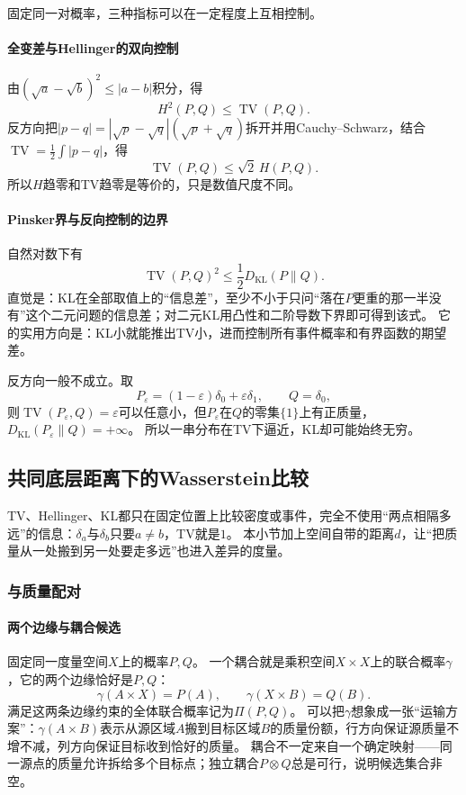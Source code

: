 固定同一对概率，三种指标可以在一定程度上互相控制。

\paragraph{全变差与Hellinger的双向控制}

由$(\sqrt a-\sqrt b)^2\leq|a-b|$积分，得
\[
 H^2(P,Q)\leq\operatorname{TV}(P,Q).
\]
反方向把$|p-q|=|\sqrt p-\sqrt q|(\sqrt p+\sqrt q)$拆开并用Cauchy–Schwarz，结合$\operatorname{TV}=\frac12\int|p-q|$，得
\[
 \operatorname{TV}(P,Q)\leq\sqrt2\,H(P,Q).
\]
所以$H$趋零和TV趋零是等价的，只是数值尺度不同。

\paragraph{Pinsker界与反向控制的边界}

自然对数下有
\[
 \operatorname{TV}(P,Q)^2\leq\frac12D_{\mathrm{KL}}(P\|Q).
\]
直觉是：KL在全部取值上的“信息差”，至少不小于只问“落在$P$更重的那一半没有”这个二元问题的信息差；对二元KL用凸性和二阶导数下界即可得到该式。
它的实用方向是：KL小就能推出TV小，进而控制所有事件概率和有界函数的期望差。

反方向一般不成立。取
\[
 P_\varepsilon=(1-\varepsilon)\delta_0+\varepsilon\delta_1,\qquad Q=\delta_0,
\]
则$\operatorname{TV}(P_\varepsilon,Q)=\varepsilon$可以任意小，但$P_\varepsilon$在$Q$的零集$\{1\}$上有正质量，$D_{\mathrm{KL}}(P_\varepsilon\|Q)=+\infty$。
所以一串分布在TV下逼近，KL却可能始终无穷。

\subsection{共同底层距离下的Wasserstein比较}

TV、Hellinger、KL都只在固定位置上比较密度或事件，完全不使用“两点相隔多远”的信息：$\delta_a$与$\delta_b$只要$a\neq b$，TV就是$1$。
本小节加上空间自带的距离$d$，让“把质量从一处搬到另一处要走多远”也进入差异的度量。

\subsubsection{与质量配对}

\paragraph{两个边缘与耦合候选}

固定同一度量空间$X$上的概率$P,Q$。
一个耦合就是乘积空间$X\times X$上的联合概率$\gamma$，它的两个边缘恰好是$P,Q$：
\[
 \gamma(A\times X)=P(A),\qquad
 \gamma(X\times B)=Q(B).
\]
满足这两条边缘约束的全体联合概率记为$\Pi(P,Q)$。
可以把$\gamma$想象成一张“运输方案”：$\gamma(A\times B)$表示从源区域$A$搬到目标区域$B$的质量份额，行方向保证源质量不增不减，列方向保证目标收到恰好的质量。
耦合不一定来自一个确定映射——同一源点的质量允许拆给多个目标点；独立耦合$P\otimes Q$总是可行，说明候选集合非空。

